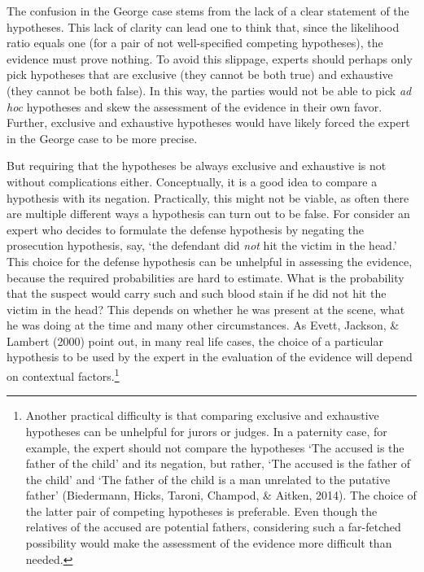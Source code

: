 \documentclass[
  10pt,
  dvipsnames,enabledeprecatedfontcommands]{scrartcl}
\begin{document}
The confusion in the George case stems from the lack of a clear
statement of the hypotheses. This lack of clarity can lead one to think
that, since the likelihood ratio equals one (for a pair of not
well-specified competing hypotheses), the evidence must prove nothing.
To avoid this slippage, experts should perhaps only pick hypotheses that
are exclusive (they cannot be both true) and exhaustive (they cannot be
both false). In this way, the parties would not be able to pick
\textit{ad hoc} hypotheses and skew the assessment of the evidence in
their own favor. Further, exclusive and exhaustive hypotheses would have
likely forced the expert in the George case to be more precise.

But requiring that the hypotheses be always exclusive and exhaustive is
not without complications either. Conceptually, it is a good idea to
compare a hypothesis with its negation. Practically, this might not be
viable, as often there are multiple different ways a hypothesis can turn
out to be false. For consider an expert who decides to formulate the
defense hypothesis by negating the prosecution hypothesis, say, `the
defendant did \textit{not} hit the victim in the head.' This choice for
the defense hypothesis can be unhelpful in assessing the evidence,
because the required probabilities are hard to estimate. What is the
probability that the suspect would carry such and such blood stain if he
did not hit the victim in the head? This depends on whether he was
present at the scene, what he was doing at the time and many other
circumstances. As Evett, Jackson, \& Lambert (2000) point out, in many
real life cases, the choice of a particular hypothesis to be used by the
expert in the evaluation of the evidence will depend on contextual
factors.\footnote{Another practical difficulty is that comparing
  exclusive and exhaustive hypotheses can be unhelpful for jurors or
  judges. In a paternity case, for example, the expert should not
  compare the hypotheses `The accused is the father of the child' and
  its negation, but rather, `The accused is the father of the child' and
  `The father of the child is a man unrelated to the putative father'
  (Biedermann, Hicks, Taroni, Champod, \& Aitken, 2014). The choice of
  the latter pair of competing hypotheses is preferable. Even though the
  relatives of the accused are potential fathers, considering such a
  far-fetched possibility would make the assessment of the evidence more
  difficult than needed.}
\end{document}
